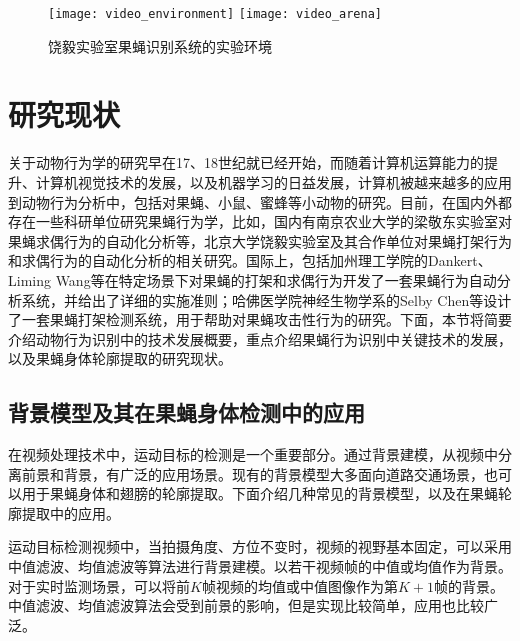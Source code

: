 \begin{figure}
\centering
{} {
    \texttt{[image: video\_environment]}
}
 {
    \texttt{[image: video\_arena]}
}
\caption{饶毅实验室果蝇识别系统的实验环境}\label{fig:raoyi_system}
\end{figure}

\section{研究现状}

关于动物行为学的研究早在17、18世纪就已经开始，而随着计算机运算能力的提升、计算机视觉技术的发展，以及机器学习的日益发展，计算机被越来越多的应用到动物行为分析中，包括对果蝇、小鼠、蜜蜂等小动物的研究\cite{physic_mice_2012,marked_mice_2013,veeraraghavan2008shape,JAABA_2013,EthoVision_2001}。目前，在国内外都存在一些科研单位研究果蝇行为学，比如，国内有南京农业大学的梁敬东实验室对果蝇求偶行为的自动化分析\cite{孙吉祥2015基于图像分割和轮廓矩的果蝇求偶行为识别方法,梁敬东2011果蝇求偶行为计算机检测识别方法,谢忠红2016基于视频的果蝇求偶行为识别和运动轨迹跟踪预测,孙吉祥2014果蝇求偶行为的图像识别算法研究,谢元澄2011基于特征选择集成学习的果蝇求偶行为识别}等，北京大学饶毅实验室及其合作单位对果蝇打架行为和求偶行为的自动化分析的相关研究\cite{chexiangqian}。国际上，包括加州理工学院的Dankert、Liming Wang等在特定场景下对果蝇的打架和求偶行为开发了一套果蝇行为自动分析系统，并给出了详细的实施准则\cite{dankert2009automated}；哈佛医学院神经生物学系的Selby Chen等设计了一套果蝇打架检测系统，用于帮助对果蝇攻击性行为的研究\cite{3D_fly_2009}。下面，本节将简要介绍动物行为识别中的技术发展概要，重点介绍果蝇行为识别中关键技术的发展，以及果蝇身体轮廓提取的研究现状。

\subsection{背景模型及其在果蝇身体检测中的应用}

在视频处理技术中，运动目标的检测是一个重要部分。通过背景建模，从视频中分离前景和背景，有广泛的应用场景\cite{fu1981survey}。现有的背景模型大多面向道路交通场景，也可以用于果蝇身体和翅膀的轮廓提取。下面介绍几种常见的背景模型，以及在果蝇轮廓提取中的应用。

运动目标检测视频中，当拍摄角度、方位不变时，视频的视野基本固定，可以采用中值滤波、均值滤波等算法\cite{cucchiara2003detecting}进行背景建模。以若干视频帧的中值或均值作为背景。对于实时监测场景，可以将前$K$帧视频的均值或中值图像作为第$K+1$帧的背景。中值滤波、均值滤波算法会受到前景的影响，但是实现比较简单，应用也比较广泛。

